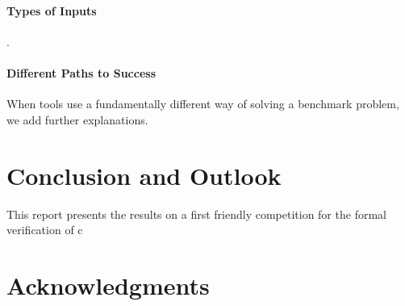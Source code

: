 \documentclass[EPiC]{easychair}
\begin{document}
\paragraph{Types of Inputs} .

\paragraph{Different Paths to Success} When tools use a fundamentally different way of solving a benchmark problem, we add further explanations. 




\section{Conclusion and Outlook}
\label{sect:conclusion}

This report presents the results on a first friendly competition for the formal verification of c


\section{Acknowledgments}
\label{sec:acks}



\end{document}
